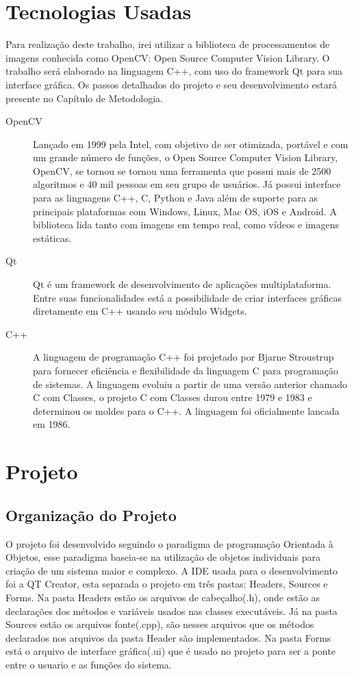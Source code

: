 \section{Tecnologias Usadas}
Para realização deste trabalho, irei utilizar a biblioteca de processamentos de imagens conhecida como OpenCV: Open Source Computer Vision Library. O trabalho será elaborado na linguagem C++, com uso do framework Qt para sua interface gráfica.
Os passos detalhados do projeto e seu desenvolvimento estará presente no Capítulo de Metodologia.
\begin{description}
	\item[OpenCV] Lançado em 1999 pela Intel\cite{Culjak:2012}, com objetivo de ser otimizada, portável e com um grande número de funções, o Open Source Computer Vision Library, OpenCV, se tornou se tornou uma ferramenta que possui mais de 2500 algoritmos e 40 mil pessoas em seu grupo de usuários\cite{Culjak:2012}. Já possui interface para as linguagens C++, C, Python e Java além de suporte para as principais plataformas com Windows, Linux, Mac OS, iOS e Android. A biblioteca lida tanto com imagens em tempo real, como vídeos e imagens estáticas.
	
	\item[Qt] Qt é um framework de desenvolvimento de aplicações multiplataforma. Entre suas funcionalidades está a possibilidade de criar interfaces gráficas diretamente em C++ usando seu módulo Widgets.
	
	\item [C++] A linguagem de programação C++ foi projetado por Bjarne Stroustrup para fornecer eficiência e flexibilidade da linguagem C para programação de sistemas. A linguagem evoluiu a partir de uma versão anterior chamado C com Classes, o projeto C com Classes durou entre 1979 e 1983 e determinou os moldes para o C++. A linguagem foi oficialmente lancada em 1986\cite{Stroustrup:1996}.
\end{description}

\section{Projeto}
\subsection{Organização do Projeto}
	 O projeto foi desenvolvido seguindo o paradigma de programação Orientada à Objetos, esse paradigma baseia-se na utilização de objetos individuais para criação de um sistema maior e complexo. A IDE usada para o desenvolvimento foi a QT Creator, esta separada o projeto em três pastas: Headers, Sources e Forms. Na pasta Headers estão os arquivos de cabeçalho(.h), onde estão as declarações dos métodos e variáveis usados nas classes  executáveis. Já na pasta Sources estão os arquivos fonte(.cpp), são nesses arquivos que os métodos declarados nos arquivos da pasta Header são implementados. Na pasta Forms está o arquivo de interface gráfica(.ui) que é usado no projeto para ser a ponte entre o usuario e as funções do sistema.
	 
